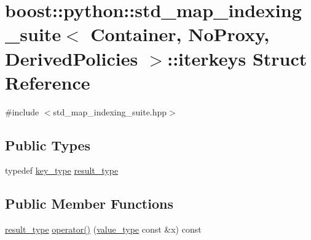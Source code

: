 \hypertarget{structboost_1_1python_1_1std__map__indexing__suite_1_1iterkeys}{\section{boost\-:\-:python\-:\-:std\-\_\-map\-\_\-indexing\-\_\-suite$<$ Container, No\-Proxy, Derived\-Policies $>$\-:\-:iterkeys Struct Reference}
\label{structboost_1_1python_1_1std__map__indexing__suite_1_1iterkeys}
}


{\ttfamily \#include $<$std\-\_\-map\-\_\-indexing\-\_\-suite.\-hpp$>$}

\subsection*{Public Types}
\begin{DoxyCompactItemize}
\item 
typedef \hyperlink{classboost_1_1python_1_1std__map__indexing__suite_a4e2daeb60a58d6ce9964e0ea27680009}{key\-\_\-type} \hyperlink{structboost_1_1python_1_1std__map__indexing__suite_1_1iterkeys_a7c12b5aeae081d2ecf524e29e5a5c343}{result\-\_\-type}
\end{DoxyCompactItemize}
\subsection*{Public Member Functions}
\begin{DoxyCompactItemize}
\item 
\hyperlink{structboost_1_1python_1_1std__map__indexing__suite_1_1iterkeys_a7c12b5aeae081d2ecf524e29e5a5c343}{result\-\_\-type} \hyperlink{structboost_1_1python_1_1std__map__indexing__suite_1_1iterkeys_a0e3b853fc4bbcc4777e5c663cc8bdd60}{operator()} (\hyperlink{classboost_1_1python_1_1std__map__indexing__suite_aff9ed68cf30e805a04a313d92c62ab38}{value\-\_\-type} const \&x) const 
\end{DoxyCompactItemize}


